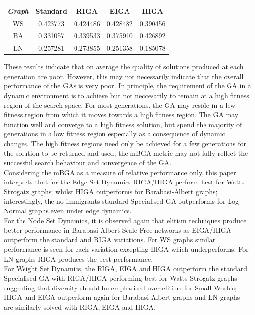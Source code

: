 \documentclass[
	a4paper, %
	10pt, %
	unnumberedsections, %
	twoside, %
]{LTJournalArticle}
\begin{document}
\begin{center}
\begin{tabular}{||c c c c c||} 
 \hline
 \emph{Graph} & Standard & RIGA & EIGA & HIGA \\ [0.5ex] 
 \hline\hline
 WS & 0.423773 & 0.424486 & 0.428482 & 0.390456 \\ 
 \hline
 BA & 0.331057 & 0.339533 & 0.375910 & 0.426892 \\
 \hline
 LN & 0.257281 & 0.273855 & 0.251358 & 0.185078 \\
\end{tabular}
\end{center}

These results indicate that on average the quality of solutions produced at each generation are poor. However, this may not necessarily indicate that the overall performance of the GAs is very poor. In principle, the requirement of the GA in a dynamic environment is to achieve but not neccesarily to remain at a high fitness region of the search space. For most generations, the GA may reside in a low fitness region from which it moves towards a high fitness region. The GA may function well and converge to a high fitness solution, but spend the majority of generations in a low fitness region especially as a consequence of dynamic changes. The high fitness regions need only be achieved for a few generations for the solution to be returned and used; the mBGA metric may not fully reflect the successful search behaviour and convergence of the GA. \\

Considering the mBGA as a measure of relative performance only, this paper interprets that for the Edge Set Dynamics RIGA/HIGA perform best for Watts-Strogatz graphs; whilst HIGA outperforms for Barabasi-Albert graphs; interestingly, the no-immigrants standard Specialised GA outperforms for Log-Normal graphs even under edge dynamics. \\

For the Node Set Dynamics, it is observed again that elitism techniques produce better performance in Barabasi-Albert Scale Free networks as EIGA/HIGA outperform the standard and RIGA variations. For WS graphs similar performance is seen for each variation excepting HIGA which underperforms. For LN graphs RIGA produces the best performance.\\

For Weight Set Dynamics, the RIGA, EIGA and HIGA outperform the standard Specialised GA with RIGA/HIGA performing best for Watts-Strogatz graphs suggesting that diversity should be emphasised over elitism for Small-Worlds; HIGA and EIGA outperform again for Barabasi-Albert graphs and LN graphs are similarly solved with RIGA, EIGA and HIGA.  \\
\end{document}
